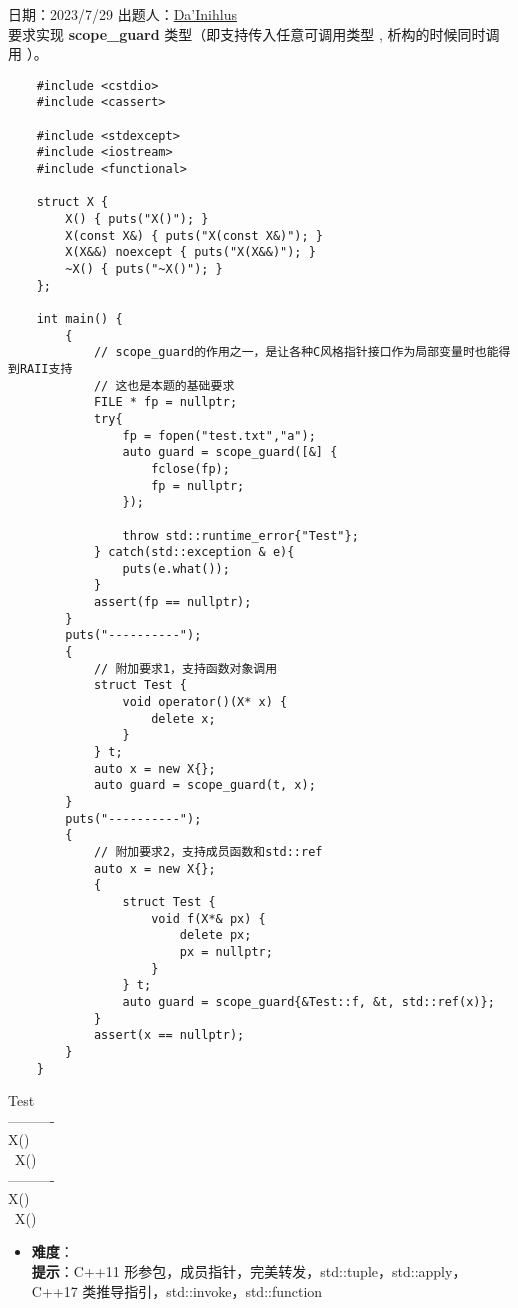 日期：2023/7/29 出题人：\href{https://github.com/dynilath}{Da'Inihlus}\\

要求实现 \textbf{scope\_guard} 类型（即支持传入任意可调用类型 , 析构的时候同时调用 ）。

\begin{verbatim}
    #include <cstdio>
    #include <cassert>
    
    #include <stdexcept>
    #include <iostream>
    #include <functional>
    
    struct X {
        X() { puts("X()"); }
        X(const X&) { puts("X(const X&)"); }
        X(X&&) noexcept { puts("X(X&&)"); }
        ~X() { puts("~X()"); }
    };
    
    int main() {
        {
            // scope_guard的作用之一，是让各种C风格指针接口作为局部变量时也能得到RAII支持
            // 这也是本题的基础要求
            FILE * fp = nullptr;
            try{
                fp = fopen("test.txt","a");
                auto guard = scope_guard([&] {
                    fclose(fp);
                    fp = nullptr;
                });
    
                throw std::runtime_error{"Test"};
            } catch(std::exception & e){
                puts(e.what());
            }
            assert(fp == nullptr);
        }
        puts("----------");
        {
            // 附加要求1，支持函数对象调用
            struct Test {
                void operator()(X* x) {
                    delete x;
                }
            } t;
            auto x = new X{};
            auto guard = scope_guard(t, x);
        }
        puts("----------");
        {
            // 附加要求2，支持成员函数和std::ref
            auto x = new X{};
            {
                struct Test {
                    void f(X*& px) {
                        delete px;
                        px = nullptr;
                    }
                } t;
                auto guard = scope_guard{&Test::f, &t, std::ref(x)};
            }
            assert(x == nullptr);
        }
    }
\end{verbatim}

\begin{tcolorbox}[title = {要求运行结果},
        fonttitle = \bfseries, fontupper = \sffamily, fontlower = \itshape]
    Test        \\
    ----------  \\
    X()         \\
    ~X()        \\
    ----------  \\
    X()         \\
    ~X()
\end{tcolorbox}

\begin{itemize}
    \item \textbf{难度}：  \\
    \textbf{提示}：C++11 形参包，成员指针，完美转发，std::tuple，std::apply，C++17 类推导指引，std::invoke，std::function
\end{itemize}